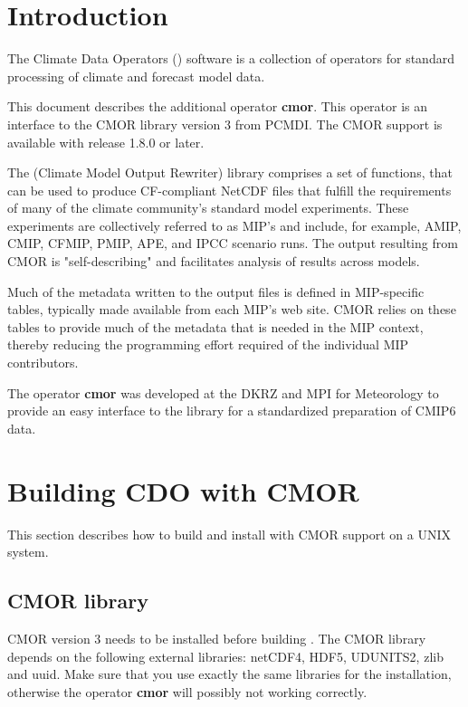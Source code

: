 \chapter{Introduction}

The Climate Data Operators ({\CDO}) software is a collection of operators
for standard processing of climate and forecast model data.

This document describes the additional {\CDO} operator \textbf{cmor}. This
operator is an interface to the CMOR library version 3 from PCMDI.
The CMOR support is available with {\CDO} release 1.8.0 or later.

The \cite{CMOR} (Climate Model Output Rewriter) library comprises a set of
functions, that can be used to produce CF-compliant NetCDF files that 
fulfill the requirements of many of the climate community's standard
model experiments. These experiments are collectively referred to as
MIP's and include, for example, AMIP, CMIP, CFMIP, PMIP, APE, and IPCC 
scenario runs. The output resulting from CMOR is "self-describing" and
facilitates analysis of results across models.

Much of the metadata written to the output files is defined in
MIP-specific tables, typically made available from each MIP's web
site. CMOR relies on these tables to provide much of the metadata 
that is needed in the MIP context, thereby reducing the programming 
effort required of the individual MIP contributors.

The  {\CDO} operator \textbf{cmor} was developed at the DKRZ and MPI for
Meteorology to provide an easy interface to the \cite{CMOR} library for a
standardized preparation of CMIP6 data.

\chapter{Building CDO with CMOR}

This section describes how to build and install {\CDO} with CMOR
support on a UNIX system.

\section{CMOR library}
 
CMOR version 3 needs to be installed before building {\CDO}.
The CMOR library depends on the following external libraries:
netCDF4, HDF5, UDUNITS2, zlib and uuid.
Make sure that you use exactly the same libraries for the {\CDO}
installation, otherwise the operator \textbf{cmor} will possibly not working correctly.

